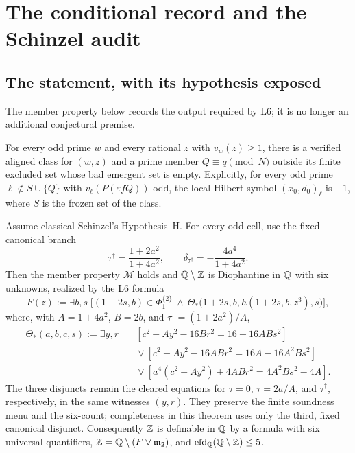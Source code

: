 \section{The conditional record and the Schinzel audit}
\label{sec:record}

\subsection{The statement, with its hypothesis exposed}

The member property below records the output required by L6; it is no
longer an additional conjectural premise.

\begin{definition}
For every odd prime $w$ and every rational $z$ with $v_w(z)\geq1$, there
is a verified aligned class for $(w,z)$ and a prime member
$Q\equiv q\pmod N$ outside its finite excluded set whose bad emergent set
is empty.  Explicitly, for every odd prime
$\ell\notin S\cup\{Q\}$ with
$v_\ell(P(\varepsilon fQ))$ odd, the local Hilbert symbol
$(x_0,d_0)_\ell$ is $+1$, where $S$ is the frozen set of the class.
\end{definition}

\begin{theorem}
Assume classical Schinzel's Hypothesis~H.  For every odd cell, use the
fixed canonical branch
\[
 \tau^\dagger=\frac{1+2a^2}{1+4a^2},
 \qquad \delta_{\tau^\dagger}=-\frac{4a^4}{1+4a^2}.
\]
Then the member property $\mathcal M$ holds and
$\mathbb{Q}\setminus\mathbb{Z}$ is Diophantine in $\mathbb{Q}$ with six unknowns,
realized by the L6 formula
\[
 F(z):=\exists b,s\;\bigl[(1+2s,b)\in\Phi_1^{\{2\}}\ \wedge\
 \Theta_*\bigl(1+2s,b,h(1+2s,b,z^3),s\bigr)\bigr],
\]
where, with $A=1+4a^2$, $B=2b$, and
$\tau^\dagger=(1+2a^2)/A$,
\[
\begin{aligned}
 \Theta_*(a,b,c,s):=\exists y,r\quad&
 [c^2-Ay^2-16Br^2=16-16ABs^2]\\
 &{}\vee[c^2-Ay^2-16ABr^2=16A-16A^2Bs^2]\\
 &{}\vee[a^4(c^2-Ay^2)+4ABr^2=4A^2Bs^2-4A].
\end{aligned}
\]
The three disjuncts remain the cleared equations for
$\tau=0$, $\tau=2a/A$, and $\tau^\dagger$, respectively, in the same
witnesses $(y,r)$.  They preserve the finite soundness menu and the
six-count; completeness in this theorem uses only the third, fixed
canonical disjunct.
Consequently $\mathbb{Z}$ is definable in $\mathbb{Q}$ by a formula with six universal
quantifiers,
$\mathbb{Z}=\mathbb{Q}\setminus(F\vee\mathfrak m_2)$, and
$\operatorname{efd}_{\mathbb{Q}}(\mathbb{Q}\setminus\mathbb{Z})\leq 5$.
\end{theorem}

